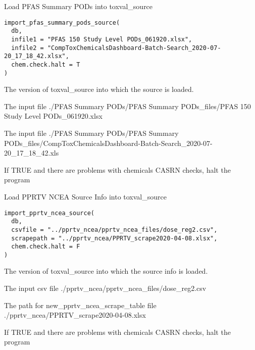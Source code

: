 \documentclass[letterpaper]{book}
\begin{document}
%
\begin{Description}\relax
Load PFAS Summary PODs into toxval\_source
\end{Description}
%
\begin{Usage}
\begin{verbatim}
import_pfas_summary_pods_source(
  db,
  infile1 = "PFAS 150 Study Level PODs_061920.xlsx",
  infile2 = "CompToxChemicalsDashboard-Batch-Search_2020-07-20_17_18_42.xlsx",
  chem.check.halt = T
)
\end{verbatim}
\end{Usage}
%
\begin{Arguments}
\begin{ldescription}
\item[\code{db}] The version of toxval\_source into which the source is loaded.

\item[\code{infile1}] The input file ./PFAS Summary PODs/PFAS Summary PODs\_files/PFAS 150 Study Level PODs\_061920.xlsx

\item[\code{infile2}] The input file ./PFAS Summary PODs/PFAS Summary PODs\_files/CompToxChemicalsDashboard-Batch-Search\_2020-07-20\_17\_18\_42.xls

\item[\code{chem.check.halt}] If TRUE and there are problems with chemicals CASRN checks, halt the program
\end{ldescription}
\end{Arguments}
%
\begin{Description}\relax
Load PPRTV NCEA Source Info into toxval\_source
\end{Description}
%
\begin{Usage}
\begin{verbatim}
import_pprtv_ncea_source(
  db,
  csvfile = "../pprtv_ncea/pprtv_ncea_files/dose_reg2.csv",
  scrapepath = "../pprtv_ncea/PPRTV_scrape2020-04-08.xlsx",
  chem.check.halt = F
)
\end{verbatim}
\end{Usage}
%
\begin{Arguments}
\begin{ldescription}
\item[\code{db}] The version of toxval\_source into which the source info is loaded.

\item[\code{csvfile}] The input csv file ./pprtv\_ncea/pprtv\_ncea\_files/dose\_reg2.csv

\item[\code{scrapepath}] The path for new\_pprtv\_ncea\_scrape\_table file ./pprtv\_ncea/PPRTV\_scrape2020-04-08.xlsx

\item[\code{chem.check.halt}] If TRUE and there are problems with chemicals CASRN checks, halt the program
\end{ldescription}
\end{Arguments}
\end{document}
